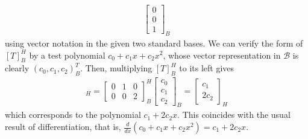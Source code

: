 \begin{solution}
\begin{align*}
\begin{bmatrix}
0 \\
0 \\
1
\end{bmatrix}_B
\end{align*}
using vector notation in the given two standard bases. We can verify the form of $[T]_B^H$ by a test polynomial $c_0 + c_1x + c_2x^2$, whose vector representation in $\mathcal{B}$ is clearly $(c_0, c_1, c_2)^T_B$. Then, multiplying $[T]_B^H$ to its left gives
\begin{align*}
[T((c_0, c_1, c_2)^T_B)]_H = 
\begin{bmatrix}
0 & 1 & 0 \\
0 & 0 & 2
\end{bmatrix}_B^H 
\begin{bmatrix}
c_0 \\
c_1 \\
c_2
\end{bmatrix}_B
=
\begin{bmatrix}
c_1 \\
2c_2
\end{bmatrix}_H
\end{align*}
which corresponds to the polynomial $c_1 + 2c_2x$. This coincides with the usual result of differentiation, that is, $\frac{d}{dx}(c_0 + c_1x + c_2x^2) = c_1 + 2c_2x$.
\end{solution}

